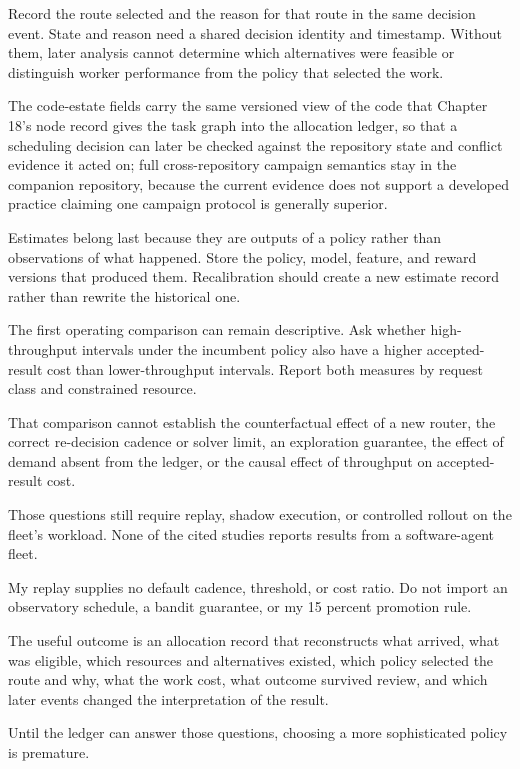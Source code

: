 Record the route selected and the reason for that route in the same decision event. State and reason need a shared decision identity and timestamp. Without them, later analysis cannot determine which alternatives were feasible or distinguish worker performance from the policy that selected the work.

The code-estate fields carry the same versioned view of the code that Chapter 18's node record gives the task graph into the allocation ledger, so that a scheduling decision can later be checked against the repository state and conflict evidence it acted on; full cross-repository campaign semantics stay in the companion repository, because the current evidence does not support a developed practice claiming one campaign protocol is generally superior.

Estimates belong last because they are outputs of a policy rather than observations of what happened. Store the policy, model, feature, and reward versions that produced them. Recalibration should create a new estimate record rather than rewrite the historical one.

The first operating comparison can remain descriptive. Ask whether high-throughput intervals under the incumbent policy also have a higher accepted-result cost than lower-throughput intervals. Report both measures by request class and constrained resource.

That comparison cannot establish the counterfactual effect of a new router, the correct re-decision cadence or solver limit, an exploration guarantee, the effect of demand absent from the ledger, or the causal effect of throughput on accepted-result cost.

Those questions still require replay, shadow execution, or controlled rollout on the fleet's workload. None of the cited studies reports results from a software-agent fleet.

My replay supplies no default cadence, threshold, or cost ratio. Do not import an observatory schedule, a bandit guarantee, or my 15 percent promotion rule.

The useful outcome is an allocation record that reconstructs what arrived, what was eligible, which resources and alternatives existed, which policy selected the route and why, what the work cost, what outcome survived review, and which later events changed the interpretation of the result.

Until the ledger can answer those questions, choosing a more sophisticated policy is premature.

